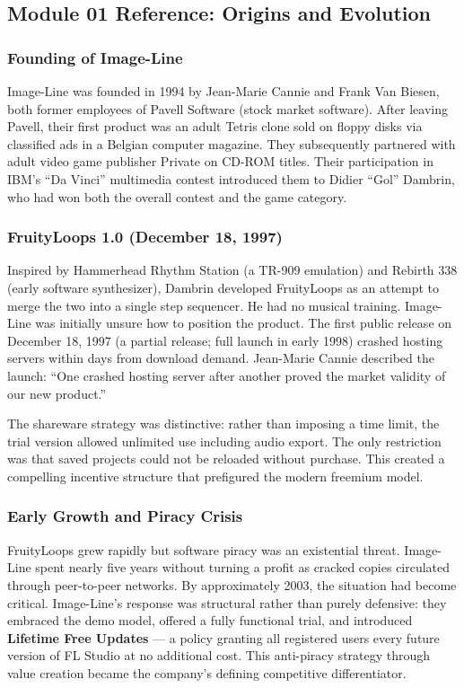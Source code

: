 \documentclass[11pt,letterpaper]{article}
\begin{document}
\subsection{Module 01 Reference: Origins and Evolution}

\subsubsection{Founding of Image-Line}

Image-Line was founded in 1994 by Jean-Marie Cannie and Frank Van Biesen, both former employees of Pavell Software (stock market software). After leaving Pavell, their first product was an adult Tetris clone sold on floppy disks via classified ads in a Belgian computer magazine. They subsequently partnered with adult video game publisher Private on CD-ROM titles. Their participation in IBM's ``Da Vinci'' multimedia contest introduced them to Didier ``Gol'' Dambrin, who had won both the overall contest and the game category.

\subsubsection{FruityLoops 1.0 (December 18, 1997)}

Inspired by Hammerhead Rhythm Station (a TR-909 emulation) and Rebirth 338 (early software synthesizer), Dambrin developed FruityLoops as an attempt to merge the two into a single step sequencer. He had no musical training. Image-Line was initially unsure how to position the product. The first public release on December 18, 1997 (a partial release; full launch in early 1998) crashed hosting servers within days from download demand. Jean-Marie Cannie described the launch: ``One crashed hosting server after another proved the market validity of our new product.''

The shareware strategy was distinctive: rather than imposing a time limit, the trial version allowed unlimited use including audio export. The only restriction was that saved projects could not be reloaded without purchase. This created a compelling incentive structure that prefigured the modern freemium model.

\subsubsection{Early Growth and Piracy Crisis}

FruityLoops grew rapidly but software piracy was an existential threat. Image-Line spent nearly five years without turning a profit as cracked copies circulated through peer-to-peer networks. By approximately 2003, the situation had become critical. Image-Line's response was structural rather than purely defensive: they embraced the demo model, offered a fully functional trial, and introduced \textbf{Lifetime Free Updates} --- a policy granting all registered users every future version of FL Studio at no additional cost. This anti-piracy strategy through value creation became the company's defining competitive differentiator.
\end{document}
